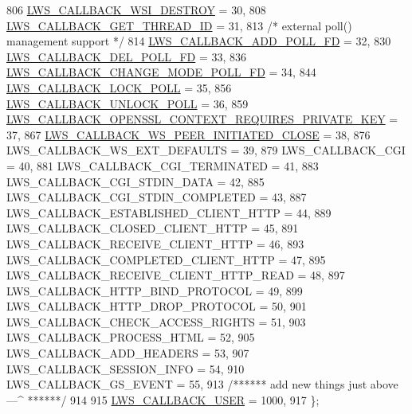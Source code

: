 \begin{DoxyCode}
806         \hyperlink{group__usercb_ggad62860e19975ba4c4af401c3cdb6abf7aca834dc035b7f7486f9ce40fde54fe9e}{LWS\_CALLBACK\_WSI\_DESTROY}                                = 30,
808         \hyperlink{group__usercb_ggad62860e19975ba4c4af401c3cdb6abf7adfb41c92e2522712207ef7f2462b5e34}{LWS\_CALLBACK\_GET\_THREAD\_ID}                            = 31,
813         \textcolor{comment}{/* external poll() management support */}
814         \hyperlink{group__usercb_ggad62860e19975ba4c4af401c3cdb6abf7ab69783a9fbf2ca71ad70706bda77b412}{LWS\_CALLBACK\_ADD\_POLL\_FD}                                = 32,
830         \hyperlink{group__usercb_ggad62860e19975ba4c4af401c3cdb6abf7a1df60f314710236f9b53efbf468da768}{LWS\_CALLBACK\_DEL\_POLL\_FD}                                = 33,
836         \hyperlink{group__usercb_ggad62860e19975ba4c4af401c3cdb6abf7aa87d2e82fffa42c3680c7403ef94216e}{LWS\_CALLBACK\_CHANGE\_MODE\_POLL\_FD}                        = 34,
844         \hyperlink{group__usercb_ggad62860e19975ba4c4af401c3cdb6abf7a8909732521d379179003d97ab7a05428}{LWS\_CALLBACK\_LOCK\_POLL}                                    = 35,
856         \hyperlink{group__usercb_ggad62860e19975ba4c4af401c3cdb6abf7a0e9e3dd667c0c42cdbe1a3d921f4fd79}{LWS\_CALLBACK\_UNLOCK\_POLL}                                = 36,
859         \hyperlink{group__usercb_ggad62860e19975ba4c4af401c3cdb6abf7aa46f705dcf97502e95627ffde614f98b}{LWS\_CALLBACK\_OPENSSL\_CONTEXT\_REQUIRES\_PRIVATE\_KEY}      
      = 37,
867         \hyperlink{group__usercb_ggad62860e19975ba4c4af401c3cdb6abf7ac3fc5bbb55e69f90396526287ee84a51}{LWS\_CALLBACK\_WS\_PEER\_INITIATED\_CLOSE}                        = 
      38,
876         LWS\_CALLBACK\_WS\_EXT\_DEFAULTS                            = 39,
879         LWS\_CALLBACK\_CGI                                        = 40,
881         LWS\_CALLBACK\_CGI\_TERMINATED                             = 41,
883         LWS\_CALLBACK\_CGI\_STDIN\_DATA                             = 42,
885         LWS\_CALLBACK\_CGI\_STDIN\_COMPLETED                        = 43,
887         LWS\_CALLBACK\_ESTABLISHED\_CLIENT\_HTTP                    = 44,
889         LWS\_CALLBACK\_CLOSED\_CLIENT\_HTTP                         = 45,
891         LWS\_CALLBACK\_RECEIVE\_CLIENT\_HTTP                        = 46,
893         LWS\_CALLBACK\_COMPLETED\_CLIENT\_HTTP                      = 47,
895         LWS\_CALLBACK\_RECEIVE\_CLIENT\_HTTP\_READ                   = 48,
897         LWS\_CALLBACK\_HTTP\_BIND\_PROTOCOL                         = 49,
899         LWS\_CALLBACK\_HTTP\_DROP\_PROTOCOL                         = 50,
901         LWS\_CALLBACK\_CHECK\_ACCESS\_RIGHTS                        = 51,
903         LWS\_CALLBACK\_PROCESS\_HTML                               = 52,
905         LWS\_CALLBACK\_ADD\_HEADERS                                = 53,
907         LWS\_CALLBACK\_SESSION\_INFO                               = 54,
910         LWS\_CALLBACK\_GS\_EVENT                                   = 55,
913         \textcolor{comment}{/****** add new things just above ---^ ******/}
914 
915         \hyperlink{group__usercb_ggad62860e19975ba4c4af401c3cdb6abf7a982579753e70e59a9ea13ce628ac891a}{LWS\_CALLBACK\_USER} = 1000,
917 \};
\end{DoxyCode}
